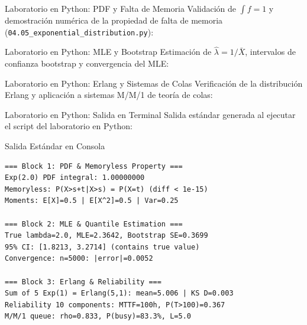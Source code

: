\documentclass[10pt, aspectratio=169]{beamer}
\begin{document}
\begin{frame}[fragile]{Laboratorio en Python: PDF y Falta de Memoria}
  \scriptsize
  Validación de $\int f = 1$ y demostración numérica de la propiedad de falta de memoria (\texttt{04.05\_exponential\_distribution.py}):
  \vspace{0.02cm}
  {
  }
\end{frame}

\begin{frame}[fragile]{Laboratorio en Python: MLE y Bootstrap}
  \scriptsize
  Estimación de $\hat{\lambda} = 1/\bar{X}$, intervalos de confianza bootstrap y convergencia del MLE:
  \vspace{0.02cm}
  {
  }
\end{frame}

\begin{frame}[fragile]{Laboratorio en Python: Erlang y Sistemas de Colas}
  \scriptsize
  Verificación de la distribución Erlang y aplicación a sistemas M/M/1 de teoría de colas:
  \vspace{0.02cm}
  {
  }
\end{frame}

\begin{frame}[fragile]{Laboratorio en Python: Salida en Terminal}
  \scriptsize
  Salida estándar generada al ejecutar el script del laboratorio en Python:
  \vspace{0.02cm}
  \begin{block}{Salida Estándar en Consola}
    \fontsize{4pt}{5pt}\selectfont
    \begin{verbatim}
=== Block 1: PDF & Memoryless Property ===
Exp(2.0) PDF integral: 1.00000000
Memoryless: P(X>s+t|X>s) = P(X=t) (diff < 1e-15)
Moments: E[X]=0.5 | E[X^2]=0.5 | Var=0.25

=== Block 2: MLE & Quantile Estimation ===
True lambda=2.0, MLE=2.3642, Bootstrap SE=0.3699
95% CI: [1.8213, 3.2714] (contains true value)
Convergence: n=5000: |error|=0.0052

=== Block 3: Erlang & Reliability ===
Sum of 5 Exp(1) = Erlang(5,1): mean=5.006 | KS D=0.003
Reliability 10 components: MTTF=100h, P(T>100)=0.367
M/M/1 queue: rho=0.833, P(busy)=83.3%, L=5.0
    \end{verbatim}
  \end{block}
\end{frame}
\end{document}
